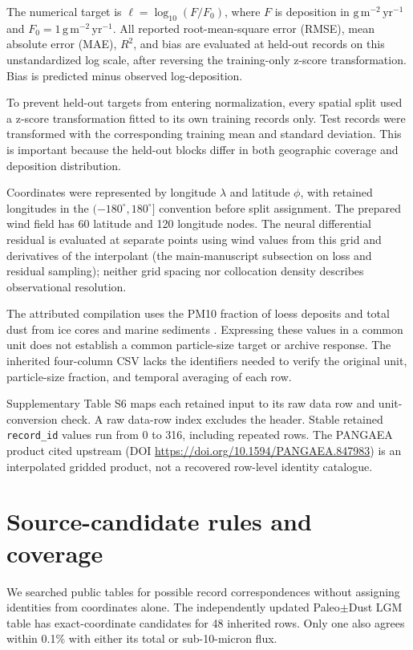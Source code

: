 \documentclass[11pt,a4paper]{article}
\begin{document}
The numerical target is $\ell=\log_{10}(F/F_0)$, where $F$ is deposition in $\mathrm{g\,m^{-2}\,yr^{-1}}$ and $F_0=1\,\mathrm{g\,m^{-2}\,yr^{-1}}$. All reported root-mean-square error (RMSE), mean absolute error (MAE), $R^2$, and bias are evaluated at held-out records on this unstandardized log scale, after reversing the training-only z-score transformation. Bias is predicted minus observed log-deposition.

To prevent held-out targets from entering normalization, every spatial split used a z-score transformation fitted to its own training records only. Test records were transformed with the corresponding training mean and standard deviation. This is important because the held-out blocks differ in both geographic coverage and deposition distribution. 

Coordinates were represented by longitude $\lambda$ and latitude $\phi$, with retained longitudes in the $(-180^{\circ},180^{\circ}]$ convention before split assignment. The prepared wind field has 60 latitude and 120 longitude nodes. The neural differential residual is evaluated at separate points using wind values from this grid and derivatives of the interpolant (the main-manuscript subsection on loss and residual sampling); neither grid spacing nor collocation density describes observational resolution.

The attributed compilation uses the PM10 fraction of loess deposits and total dust from ice cores and marine sediments \citep{Lambert2015}. Expressing these values in a common unit does not establish a common particle-size target or archive response. The inherited four-column CSV lacks the identifiers needed to verify the original unit, particle-size fraction, and temporal averaging of each row.

Supplementary Table S6 maps each retained input to its raw data row and unit-conversion check. A raw data-row index excludes the header. Stable retained \texttt{record\_id} values run from 0 to 316, including repeated rows. The PANGAEA product cited upstream (DOI \url{https://doi.org/10.1594/PANGAEA.847983}) is an interpolated gridded product, not a recovered row-level identity catalogue.

\section{Source-candidate rules and coverage}
We searched public tables for possible record correspondences without assigning identities from coordinates alone. The independently updated Paleo$\pm$Dust LGM table \citep{Cosentino2024} has exact-coordinate candidates for 48 inherited rows. Only one also agrees within 0.1\% with either its total or sub-10-micron flux. 
\end{document}
